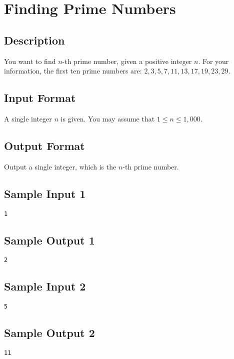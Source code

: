 

\section{Finding Prime Numbers}

\subsection*{Description}
You want to find $n$-th prime number, given a positive integer $n$. 
For your information, the first ten prime numbers are:
$2, 3, 5, 7, 11, 13, 17, 19, 23, 29$. 

\subsection*{Input Format}
A single integer $n$ is given. You may assume that $1 \leq n \leq 1,000$. 

\subsection*{Output Format}
Output a single integer, which is the $n$-th prime number.

\subsection*{Sample Input 1}
\begin{verbatim}
1
\end{verbatim}

\subsection*{Sample Output 1}
\begin{verbatim}
2
\end{verbatim}

\subsection*{Sample Input 2}
\begin{verbatim}
5
\end{verbatim}

\subsection*{Sample Output 2}
\begin{verbatim}
11
\end{verbatim}



